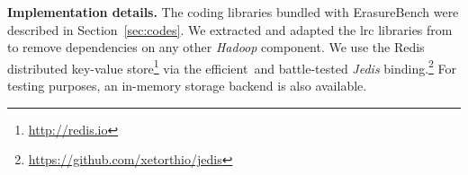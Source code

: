\textbf{Implementation details.}
The coding libraries bundled with ErasureBench were described in Section~\ref{sec:codes}. 
We extracted and adapted the \ac{lrc} libraries from \autocite{XorbasVLDB} to remove dependencies on any other \textit{Hadoop} component. 
We use the Redis distributed key-value store\footnote{\url{http://redis.io}} via the efficient and battle-tested \textit{Jedis}  binding.\footnote{\url{https://github.com/xetorthio/jedis}}
For testing purposes, an in-memory storage backend is also available.

